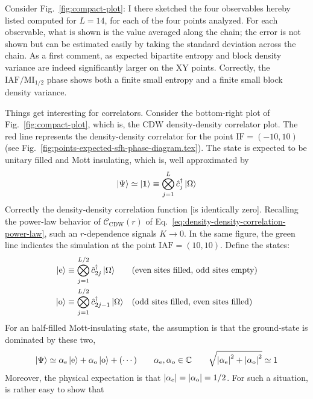 Consider Fig.~\ref{fig:compact-plot}: I there sketched the four observables hereby listed computed for $L=14$, for each of the four points analyzed. For each observable, what is shown is the value averaged along the chain; the error is not shown but can be estimated easily by taking the standard deviation across the chain. As a first comment, as expected bipartite entropy and block density variance are indeed significantly larger on the $\mathrm{XY}$ points. Correctly, the $\mathrm{IAF}/\mathrm{MI}_{1/2}$ phase shows both a finite small entropy and a finite small block density variance.

Things get interesting for correlators. Consider the bottom-right plot of Fig.~\ref{fig:compact-plot}, which is, the $\mathrm{CDW}$ density-density correlator plot. The red line represents the density-density correlator for the point $\mathrm{IF}=(-10,10)$ (see Fig.~\ref{fig:points-expected-sfh-phase-diagram.tex}). The state is expected to be unitary filled and Mott insulating, which is, well approximated by
\begin{equation}\label{eq:unitary-state-definition}
	\ket{\Psi} \simeq \ket{\bm{1}} \equiv \bigotimes_{j=1}^L \hat c_j^\dagger \ket{\Omega}
\end{equation}
Correctly the density-density correlation function {\color{tabred}[is identically zero]}. Recalling the power-law behavior of $\mathcal{C}_\mathrm{CDW}(r)$ of Eq.~\eqref{eq:density-density-correlation-power-law}, such an $r$-dependence signals $K \to 0$. In the same figure, the green line indicates the simulation at the point $\mathrm{IAF}=(10,10)$. Define the states:
\begin{align}
	\ket{\mathrm{e}} &\equiv \bigotimes_{j=1}^{L/2} \hat c_{2j}^\dagger \ket{\Omega}
	&&\text{(even sites filled, odd sites empty)}
	\label{eq:even-state-definition}
	\\
	\ket{\mathrm{o}} &\equiv \bigotimes_{j=1}^{L/2} \hat c_{2j-1}^\dagger \ket{\Omega}
	&&\text{(odd sites filled, even sites filled)}
	\label{eq:odd-state-definition}
\end{align}
For an half-filled Mott-insulating state, the assumption is that the ground-state is dominated by these two,
\[
	\ket{\Psi} \simeq \alpha_\mathrm{e} \ket{\mathrm{e}} + \alpha_\mathrm{o} \ket{\mathrm{o}} + (\cdots)
	\qquad
	\alpha_\mathrm{e}, \alpha_\mathrm{o} \in \mathbb{C}
	\qquad
	\sqrt{\abs{\alpha_\mathrm{e}}^2 + \abs{\alpha_\mathrm{o}}^2} \simeq 1
\]
Moreover, the physical expectation is that $\abs{\alpha_\mathrm{e}} = \abs{\alpha_\mathrm{o}} = 1/2$. For such a situation, is rather easy to show that
